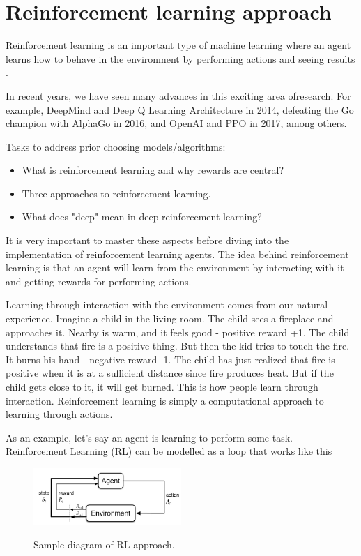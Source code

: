 \documentclass{article}
\numberwithin{equation}{subsection}
\begin{document}
\section{Reinforcement learning approach}

Reinforcement learning is an important type of machine learning where an agent learns how to behave in the environment by performing actions and seeing results \cite{freecodecamp}.

In recent years, we have seen many advances in this exciting area of ​​research. For example, DeepMind and Deep Q Learning Architecture in 2014, defeating the Go champion with AlphaGo in 2016, and OpenAI and PPO in 2017, among others.

Tasks to address prior choosing models/algorithms:
\begin{itemize}
	\item What is reinforcement learning and why rewards are central?
	\item Three approaches to reinforcement learning.
	\item What does "deep" mean in deep reinforcement learning?
\end{itemize}

It is very important to master these aspects before diving into the implementation of reinforcement learning agents. The idea behind reinforcement learning is that an agent will learn from the environment by interacting with it and getting rewards for performing actions.

Learning through interaction with the environment comes from our natural experience. Imagine a child in the living room. The child sees a fireplace and approaches it. Nearby is warm, and it feels good - positive reward +1. The child understands that fire is a positive thing. But then the kid tries to touch the fire. It burns his hand - negative reward -1. The child has just realized that fire is positive when it is at a sufficient distance since fire produces heat. But if the child gets close to it, it will get burned. This is how people learn through interaction. Reinforcement learning is simply a computational approach to learning through actions.

As an example, let's say an agent is learning to perform some task. Reinforcement Learning (RL) can be modelled as a loop \cite{sutton2018reinforcement} that works like this

\begin{figure}[H]
	{\centering
	  {\includegraphics[width = 0.5\textwidth]{rlDiagram}
	  }
	  \par}
	\caption{Sample diagram of RL approach.}
	\label{fig:rl-diagram}
\end{figure}
\end{document}
